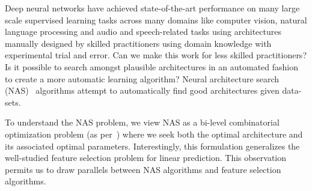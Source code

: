 

Deep neural networks have achieved state-of-the-art performance on
many large scale supervised learning tasks across many domains like
computer vision, natural language processing and audio and
speech-related tasks using architectures manually designed by skilled
practitioners using domain knowledge with experimental trial and
error.  Can we make this work for less skilled practitioners?  Is it
possible to search amongst plausible architectures in an automated
fashion to create a more automatic learning algorithm?  Neural
architecture search (NAS)~\citep{nas} algorithms attempt to
automatically find good architectures given data-sets.

To understand the NAS problem, we view NAS 
as a bi-level combinatorial optimization problem (as per~\citep{Liu2018DARTSDA}) where we seek both the optimal architecture 
and its associated optimal parameters.  Interestingly, this formulation 
generalizes the well-studied feature selection problem for linear prediction. 
This observation permits us to draw parallels between NAS algorithms 
and feature selection algorithms. 

